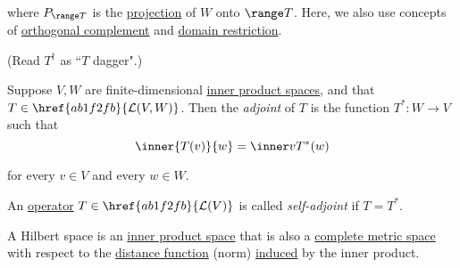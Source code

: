 where $P_{\range T}$ is the \href{dbfa2fa}{projection} of $W$ onto $\range T$.
Here, we also use concepts of \href{c3c519f}{orthogonal complement} and
\href{efec72b}{domain restriction}.

(Read $T^\dagger$ as ``$T$ dagger".)

\label{c84f503}

Suppose $V,W$ are finite-dimensional \href{b9935c8}{inner product spaces}, and
that $T\in\href{ab1f2fb}{\mathcal L(V,W)}$. Then the \textit{adjoint} of $T$ is
the function $T^*:W\to V$ such that
$$
  \inner{T(v)}{w}=\inner v{T^*(w)}
$$

for every $v\in V$ and every $w\in W$.

\label{d484753}

An \href{bd31d9c}{operator} $T\in\href{ab1f2fb}{\mathcal L(V)}$ is called
\textit{self-adjoint} if $T=T^*$.

\label{b8c0fec}

A Hilbert space is an \href{b9935c8}{inner product space} that is also a
\href{beab911}{complete metric space} with respect to the
\href{d23883d}{distance function} (norm) \href{d828dac}{induced} by the inner
product.

